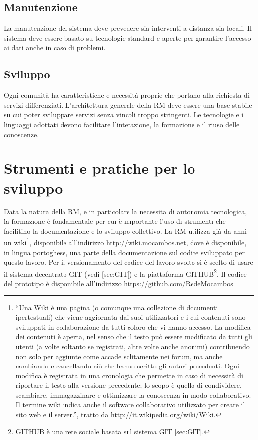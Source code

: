 \subsection{Manutenzione}
La manutenzione del sistema deve prevedere sia interventi a distanza
sia locali. Il sistema deve essere basato su tecnologie standard e
aperte per garantire l'accesso ai dati anche in caso di problemi.

\subsection{Sviluppo}
Ogni comunità ha caratteristiche e necessità proprie che portano alla
richiesta di servizi differenziati. L'architettura generale della RM
deve essere una base stabile su cui poter sviluppare servizi senza
vincoli troppo stringenti. Le tecnologie e i linguaggi adottati devono
facilitare l'interazione, la formazione e il riuso delle conoscenze. 

\section{Strumenti e pratiche per lo sviluppo}
Data la natura della RM, e in particolare la necessita di autonomia
tecnologica, la formazione è fondamentale per cui è importante l'uso
di strumenti che facilitino la documentazione e lo sviluppo
collettivo. La RM utilizza già da anni un wiki\footnote{``Una Wiki è
  una pagina (o comunque una collezione di documenti ipertestuali) che
  viene aggiornata dai suoi utilizzatori e i cui contenuti sono
  sviluppati in collaborazione da tutti coloro che vi hanno
  accesso. La modifica dei contenuti è aperta, nel senso che il testo
  può essere modificato da tutti gli utenti (a volte soltanto se
  registrati, altre volte anche anonimi) contribuendo non solo per
  aggiunte come accade solitamente nei forum, ma anche cambiando e
  cancellando ciò che hanno scritto gli autori precedenti.  Ogni
  modifica è registrata in una cronologia che permette in caso di
  necessità di riportare il testo alla versione precedente; lo scopo è
  quello di condividere, scambiare, immagazzinare e ottimizzare la
  conoscenza in modo collaborativo. Il termine wiki indica anche il
  software collaborativo utilizzato per creare il sito web e il
  server.'', tratto da \url{http://it.wikipedia.org/wiki/Wiki}.},
disponibile all'indirizzo \url{http://wiki.mocambos.net}, dove è
disponibile, in lingua portoghese, una parte della documentazione sul
codice sviluppato per questo lavoro. Per il versionamento del codice
del lavoro svolto si è scelto di usare il sistema decentrato GIT (vedi
\ref{sec:GIT}) e la piattaforma
GITHUB\footnote{\href{http://github.com}{GITHUB} è una rete sociale
  basata sul sistema GIT \ref{sec:GIT}.}. Il codice del prototipo è
disponibile all'indirizzo \url{https://github.com/RedeMocambos}

